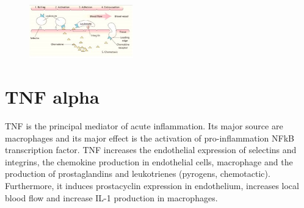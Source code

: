 \begin{figure}[ht]
\centering
\includegraphics[width=0.4\textwidth]{leuko}
\caption{\label{fig:leuko}}
\end{figure}
 
\section{TNF alpha}
TNF is the principal mediator of acute inflammation.
Its major source are macrophages and its major effect is the activation of pro-inflammation NFkB transcription factor.
TNF increases the endothelial expression of selectins and integrins, the chemokine production in endothelial cells, macrophage and the production of prostaglandins and leukotrienes (pyrogens, chemotactic). 
Furthermore, it induces prostacyclin expression in endothelium, increases local blood flow and increase IL-1 production in macrophages.

